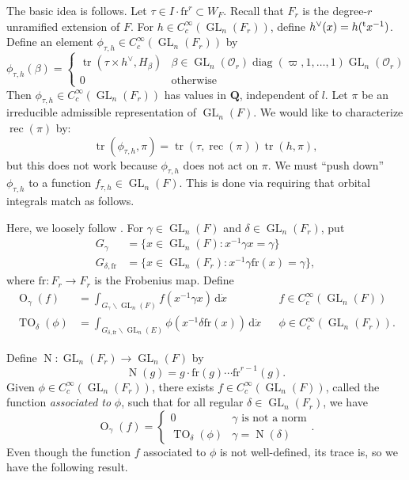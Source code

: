 \documentclass{article}
\DeclareMathOperator{\GL}{GL}
\DeclareMathOperator{\norm}{N}
\DeclareMathOperator{\orbital}{O}
\DeclareMathOperator{\reciprocity}{rec}
\DeclareMathOperator{\trace}{tr}
\DeclareMathOperator{\twistedorbital}{TO}
\newcommand{\frob}{\mathrm{fr}} %
\newcommand{\transpose}[1]{\prescript{\mathrm{t}}{}{#1}}
\newcommand{\cO}{\mathcal{O}}
\newcommand{\dQ}{\mathbf{Q}}
\begin{document}
The basic idea is follows. Let $\tau\in I\cdot \frob^r\subset W_F$. Recall 
that $F_r$ is the degree-$r$ unramified extension of $F$. For 
$h\in C_c^\infty(\GL_n(F_r))$, define $h^\vee(x) = h(\transpose x^{-1})$. 
Define an element $\phi_{\tau,h}\in C_c^\infty(\GL_n(F_r))$ by 
\begin{equation*}\tag{$\ast$}\label{eq:fun-def}
  \phi_{\tau,h}(\beta) = \begin{cases} \trace(\tau\times h^\vee,H_\beta) & \beta\in \GL_n(\cO_r)\operatorname{diag}(\varpi,1,\dots,1)\GL_n(\cO_r) \\ 0 & \text{otherwise} \end{cases}
\end{equation*}
Then $\phi_{\tau,h}\in C_c^\infty(\GL_n(F_r))$ has values in $\dQ$, independent 
of $l$. Let $\pi$ be an irreducible admissible representation of $\GL_n(F)$. 
We would like to characterize $\reciprocity(\pi)$ by: 
\[
  \trace(\phi_{\tau,h},\pi) = \trace(\tau,\reciprocity(\pi))\trace(h,\pi) ,
\]
but this does not work because $\phi_{\tau,h}$ does not act on $\pi$. We must 
``push down'' $\phi_{\tau,h}$ to a function $f_{\tau,h}\in \GL_n(F)$. This is 
done via requiring that orbital integrals match as follows. 

Here, we loosely follow \cite[1.3]{arthur-clozel-1989}. For 
$\gamma\in \GL_n(F)$ and $\delta\in \GL_n(F_r)$, put 
\begin{align*}
  G_\gamma &= \{x\in \GL_n(F):x^{-1} \gamma x = \gamma\} \\
  G_{\delta,\frob} &= \{x\in \GL_n(F_r):x^{-1} \gamma \frob(x) = \gamma\} ,
\end{align*}
where $\frob:F_r\to F_r$ is the Frobenius map. Define 
\begin{align*}
  \orbital_\gamma(f) 
    &= \int_{G_\gamma\backslash \GL_n(F)} f(x^{-1} \gamma x)\, \mathrm{d} \dot x && f\in C_c^\infty(\GL_n(F)) \\ 
  \twistedorbital_\delta(\phi) 
    &= \int_{G_{\delta,\frob}\backslash \GL_n(E)} \phi(x^{-1} \delta \frob(x))\, \mathrm{d}\dot x && \phi\in C_c^\infty(\GL_n(F_r)) .
\end{align*}

Define $\norm:\GL_n(F_r)\to \GL_n(F)$ by 
\[
  \norm(g) = g\cdot \frob(g)\dotsm \frob^{r-1}(g) .
\]
Given $\phi\in C_c^\infty(\GL_n(F_r))$, there exists 
$f\in C_c^\infty(\GL_n(F))$, called the function \emph{associated to} $\phi$, 
such that for all regular $\delta\in \GL_n(F_r)$, we have 
\[
  \orbital_\gamma(f) = 
  \begin{cases} 
    0 & \gamma\text{ is not a norm} \\ 
    \twistedorbital_\delta(\phi) & \gamma=\norm(\delta)
  \end{cases} .
\]
Even though the function $f$ associated to $\phi$ is not well-defined, 
its trace is, so we have the following result. 
\end{document}
